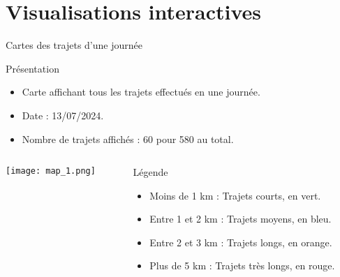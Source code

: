 \documentclass[10pt,svgnames,fragile]{beamer}
\begin{document}
\section{Visualisations interactives}
\label{sec:visualizations}
\begin{frame}[label={sec:visualizationsday}]{Cartes des trajets d’une journée}
\begin{block}{Présentation}
\begin{itemize}
    \item Carte affichant tous les trajets effectués en une journée.
    \item Date : 13/07/2024.
    \item Nombre de trajets affichés : 60 pour 580 au total.
\end{itemize}
\end{block}

\begin{columns}
    \begin{column}{0.6\textwidth}
        \texttt{[image: map\_1.png]} 
    \end{column}

    \begin{column}{0.4\textwidth}
        \begin{block}{Légende}
            \begin{itemize}
                \item \textcolor{green}{\textbullet} Moins de 1 km : Trajets courts, en vert.
                \item \textcolor{blue}{\textbullet} Entre 1 et 2 km : Trajets moyens, en bleu.
                \item \textcolor{orange}{\textbullet} Entre 2 et 3 km : Trajets longs, en orange.
                \item \textcolor{red}{\textbullet} Plus de 5 km : Trajets très longs, en rouge.
            \end{itemize}
        \end{block}
    \end{column}
\end{columns}
\end{frame}
\end{document}
